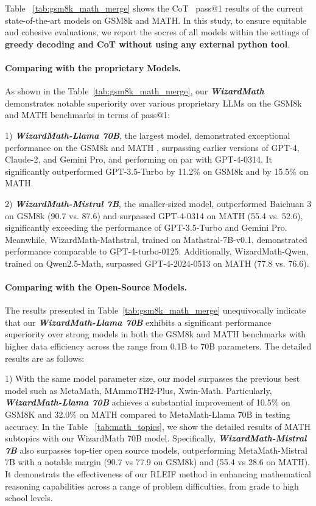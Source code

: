 Table ~\ref{tab:gsm8k_math_merge} shows the CoT~\citep{wei2022chain} pass@1 results of the current state-of-the-art models on GSM8k and MATH. In this study, to ensure equitable and cohesive evaluations, we report the socres of all models within the settings of \textbf{greedy decoding and CoT without using any external python tool}. 

\paragraph{Comparing with the proprietary Models.} As shown in the Table~\ref{tab:gsm8k_math_merge}, our \emph{\textbf{WizardMath}} demonstrates notable superiority over various proprietary LLMs on the  GSM8k and MATH benchmarks in terms of pass@1:

1) \emph{\textbf{WizardMath-Llama 70B}}, the largest model, demonstrated exceptional performance on the GSM8k and MATH , surpassing earlier versions of GPT-4, Claude-2, and Gemini Pro, and performing on par with GPT-4-0314. It significantly outperformed GPT-3.5-Turbo by 11.2\% on GSM8k and by 15.5\% on MATH.

2) \emph{\textbf{WizardMath-Mistral 7B}}, the smaller-sized model, outperformed Baichuan 3 on GSM8k (90.7 vs. 87.6) and surpassed GPT-4-0314 on MATH (55.4 vs. 52.6), significantly exceeding the performance of GPT-3.5-Turbo and Gemini Pro. Meanwhile, WizardMath-Mathstral, trained on Mathstral-7B-v0.1, demonstrated performance comparable to GPT-4-turbo-0125. Additionally, WizardMath-Qwen, trained on Qwen2.5-Math, surpassed GPT-4-2024-0513 on MATH (77.8 vs. 76.6).

\paragraph{Comparing with the Open-Source Models.} The results presented in Table~\ref{tab:gsm8k_math_merge} unequivocally indicate that our \emph{\textbf{WizardMath-Llama 70B}} exhibits a significant performance superiority over strong models in both the GSM8k and MATH benchmarks with higher data efficiency across the range from 0.1B to 70B parameters. The detailed results are as follows:

1) With the same model parameter size, our model surpasses the previous best model such as MetaMath, MAmmoTH2-Plus, Xwin-Math. Particularly, \emph{\textbf{WizardMath-Llama 70B}} achieves a substantial improvement of 10.5\% on GSM8K and 32.0\% on MATH compared to MetaMath-Llama 70B in testing accuracy.  In the Table ~\ref{tab:math_topics}, we show the detailed results of MATH subtopics with our WizardMath 70B model.  Specifically, \emph{\textbf{WizardMath-Mistral 7B}} also surpasses top-tier open source models, outperforming MetaMath-Mistral 7B with a notable margin (90.7 vs 77.9 on GSM8k) and (55.4 vs 28.6 on MATH). It demonstrats the effectiveness of our RLEIF method in enhancing mathematical reasoning capabilities across a range of problem difficulties, from grade to high school levels.

